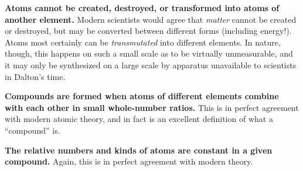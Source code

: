 \vskip 10pt

{\bf Atoms cannot be created, destroyed, or transformed into atoms of another element.}  Modern scientists would agree that {\it matter} cannot be created or destroyed, but may be converted between different forms (including energy!).  Atoms most certainly can be {\it transmutated} into different elements.  In nature, though, this happens on such a small scale as to be virtually unmeasurable, and it may only be synthesized on a large scale by apparatus unavailable to scientists in Dalton's time.

\vskip 10pt

{\bf Compounds are formed when atoms of different elements combine with each other in small whole-number ratios.}  This is in perfect agreement with modern atomic theory, and in fact is an excellent definition of what a ``compound'' is.

\vskip 10pt

{\bf The relative numbers and kinds of atoms are constant in a given compound.}  Again, this is in perfect agreement with modern theory.











